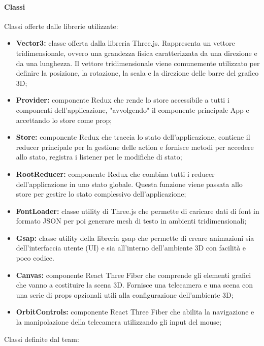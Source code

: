 \paragraph{Classi}
    Classi offerte dalle librerie utilizzate:
    \begin{itemize}
        \item \textbf{Vector3:} classe offerta dalla libreria Three.js. Rappresenta un vettore tridimensionale, ovvero
        una grandezza fisica caratterizzata da una direzione e da una lunghezza. Il vettore tridimensionale
        viene comunemente utilizzato per definire la posizione, la rotazione, la scala e la direzione
        delle barre del grafico 3D;
        \item \textbf{Provider:} componente Redux che rende lo store accessibile a tutti i componenti dell'applicazione, "avvolgendo" il componente principale App e accettando lo store come prop;
        \item \textbf{Store:} componente Redux che traccia lo stato dell'applicazione, contiene il reducer principale per la gestione delle action e fornisce metodi per accedere allo stato,
        registra i listener per le modifiche di stato;
        \item \textbf{RootReducer:} componente Redux che combina tutti i reducer dell’applicazione in uno stato
        globale. Questa funzione viene passata allo store per gestire lo stato complessivo dell’applicazione;
        \item \textbf{FontLoader:} classe utility di Three.js che permette di caricare dati di font in formato JSON per poi generare mesh di testo in ambienti tridimensionali;
        \item \textbf{Gsap:} classe utility della libreria gsap che permette di creare animazioni sia dell'interfaccia utente (UI) e sia all'interno dell'ambiente 3D con facilità e poco codice.
        \item \textbf{Canvas:} componente React Three Fiber che comprende gli elementi grafici che vanno a costituire la scena 3D. 
        Fornisce una telecamera e una scena con una serie di props opzionali utili alla configurazione dell’ambiente 3D;
        \item \textbf{OrbitControls:} componente React Three Fiber che abilita la navigazione e la manipolazione della telecamera utilizzando gli input del mouse;
    \end{itemize}
    Classi definite dal team:

